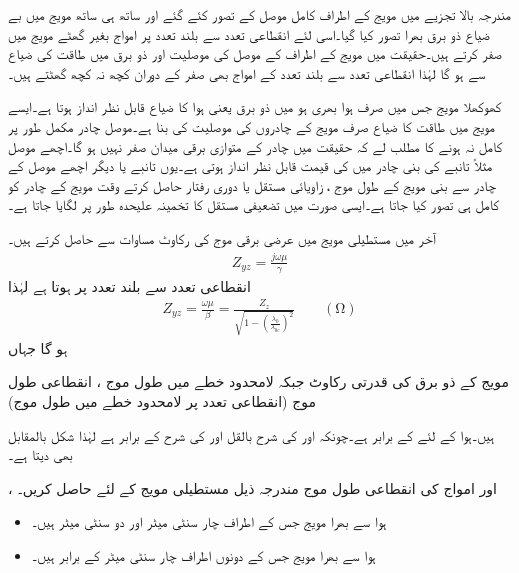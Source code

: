 مندرجہ بالا تجزیے میں مویج کے اطراف کامل موصل کے تصور کئے گئے اور ساتھ ہی ساتھ مویج میں بے ضیاع ذو برق بھرا تصور کیا گیا۔اسی لئے انقطاعی تعدد سے بلند تعدد پر امواج بغیر گھٹے مویج میں صفر کرتے ہیں۔حقیقت میں مویج کے اطراف کے موصل کی موصلیت اور ذو برق میں طاقت کی ضیاع سے   ہو گا لہٰذا انقطاعی تعدد سے بلند تعدد کے امواج بھی صفر کے دوران کچھ نہ کچھ گھٹتے ہیں۔

کھوکھلا مویج جس میں صرف ہوا بھری ہو میں ذو برق یعنی ہوا کا ضیاع  قابل نظر انداز ہوتا ہے۔ایسے مویج میں طاقت کا ضیاع صرف مویج کے چادروں کی موصلیت کی بنا ہے۔موصل چادر مکمل طور پر کامل نہ ہونے کا مطلب لے کہ حقیقت میں چادر کے متوازی برقی میدان  صفر نہیں ہو گا۔اچھے موصل مثلاً تانبے کی بنی چادر میں  کی قیمت قابل نظر انداز ہوتی ہے۔یوں تانبے یا دیگر اچھے موصل کے چادر سے بنی مویج کے طول موج ، زاویائی مستقل  یا دوری رفتار  حاصل کرتے وقت مویج کے چادر کو کامل ہی تصور کیا جاتا ہے۔ایسی صورت میں تضعیفی مستقل  کا تخمینہ  علیحدہ طور پر لگایا جاتا ہے۔

آخر میں مستطیلی مویج میں عرضی برقی موج کی رکاوٹ  مساوات  سے حاصل کرتے ہیں۔
\begin{align}
Z_{yz}=\frac{j\omega \mu}{\gamma}
\end{align} 
انقطاعی تعدد سے بلند تعدد پر  ہوتا ہے لہٰذا
\begin{align}\label{مساوات_مویج_عرضی_برقی_رکاوٹ_حتمی}
Z_{yz}=\frac{\omega \mu}{\beta}=\frac{Z_z}{\sqrt{1-\left(\frac{\lambda_0}{\lambda_{0c}}\right)^2}} \quad \quad (\si{\ohm})
\end{align} 
ہو گا جہاں
\begin{description}
 مویج کے ذو برق کی قدرتی رکاوٹ  جبکہ
 لامحدود خطے میں طول موج ،
 انقطاعی طول موج (انقطاعی تعدد پر لامحدود خطے میں طول موج)
\end{description}
ہیں۔ہوا کے لئے  کے برابر ہے۔چونکہ  اور  کی شرح بالقل  اور  کی شرح کے برابر ہے لہٰذا شکل    بالمقابل  بھی دیتا ہے۔

،  اور   امواج کی انقطاعی طول موج مندرجہ ذیل مستطیلی مویج کے لئے حاصل کریں۔
\begin{itemize}
\item
ہوا سے بھرا مویج جس کے اطراف  چار سنٹی میٹر اور دو سنٹی میٹر ہیں۔
\item
ہوا سے بھرا مویج جس کے دونوں اطراف  چار سنٹی میٹر کے برابر ہیں۔
\end{itemize} 

